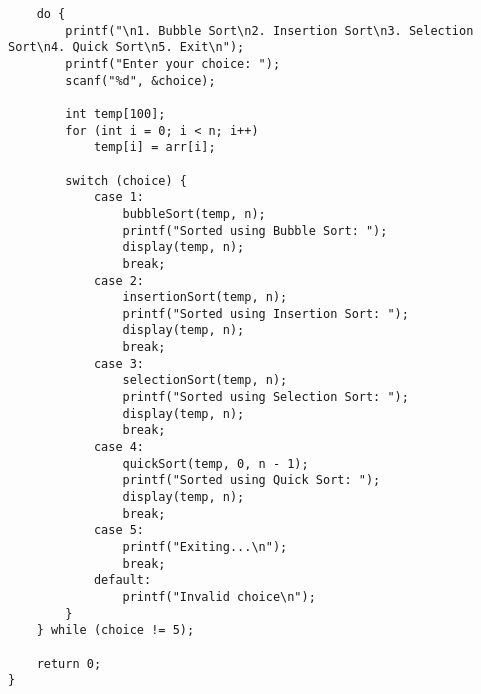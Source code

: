 \documentclass[12pt,a4paper]{article}
\begin{document}
\begin{lstlisting}
    do {
        printf("\n1. Bubble Sort\n2. Insertion Sort\n3. Selection Sort\n4. Quick Sort\n5. Exit\n");
        printf("Enter your choice: ");
        scanf("%d", &choice);

        int temp[100];
        for (int i = 0; i < n; i++)
            temp[i] = arr[i];

        switch (choice) {
            case 1:
                bubbleSort(temp, n);
                printf("Sorted using Bubble Sort: ");
                display(temp, n);
                break;
            case 2:
                insertionSort(temp, n);
                printf("Sorted using Insertion Sort: ");
                display(temp, n);
                break;
            case 3:
                selectionSort(temp, n);
                printf("Sorted using Selection Sort: ");
                display(temp, n);
                break;
            case 4:
                quickSort(temp, 0, n - 1);
                printf("Sorted using Quick Sort: ");
                display(temp, n);
                break;
            case 5:
                printf("Exiting...\n");
                break;
            default:
                printf("Invalid choice\n");
        }
    } while (choice != 5);

    return 0;
}
\end{lstlisting}
\newpage
\end{document}
